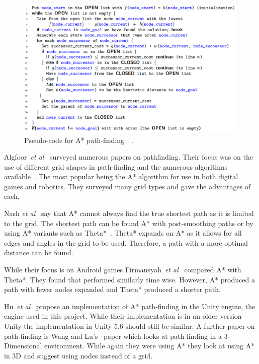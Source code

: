 \documentclass[journal]{IEEEtran}
\begin{document}
	\begin{figure}[H]
		\includegraphics[width=1.0\linewidth]{APseudocode.png}
		\caption{Pseudo-code for A* path-finding~\cite{Hart1968}~\cite{pseudocode:A*}.}
		\label{A*Pseudo}
	\end{figure} 
	
	Algfoor~\textit{et al}~\cite{Algfoor2015} surveyed numerous papers on pathfinding. Their focus was on the use of different grid shapes in path-finding and the numerous algorithms available~\cite{Algfoor2015}. The most popular being the A* algorithm for use in both digital games and robotics. They surveyed many grid types and gave the advantages of each. 
	
	Nash \textit{et al}~\cite{Nash2007} say that A* cannot always find the true shortest path as it is limited to the grid. The shortest path can be found A* with post-smoothing paths or by using A* variants such as Theta*~\cite{Nash2007, Firmansyah2016}. Theta* expands on A* as it allows for all edges and angles in the grid to be used. Therefore, a path with a more optimal distance can be found.
	
	While their focus is on Android games Firmansyah~\textit{et al}~\cite{Firmansyah2016} compared A* with Theta*. They found that performed similarly time wise. However, A* produced a path with fewer nodes expanded and Theta* produced a shorter path. 
	
	Hu~\textit{et al}~\cite{Hu2012} propose an implementation of A* path-finding in the Unity engine, the engine used in this project.  While their implementation is in an older version Unity the implementation in Unity 5.6 should still be similar. A further paper on path-finding is Wang and Lu's~\cite{wang2012} paper which looks at path-finding in a 3-Dimensional environment. While again they were using A* they look at using A* in 3D and suggest using nodes instead of a grid.
	
\end{document}
